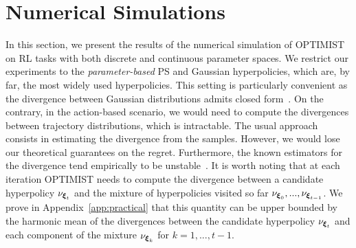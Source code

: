 \documentclass{article}
\makeatletter
\DeclareRobustCommand{\algoname}{OPTIMIST\@\xspace}
\makeatother
\begin{document}
\section{Numerical Simulations}\label{sec:exp}
In this section, we present the results of the numerical simulation of \algoname on RL tasks with both discrete and continuous parameter spaces. We restrict our experiments to the \emph{parameter-based} PS and Gaussian hyperpolicies, which are, by far, the most widely used hyperpolicies. This setting is particularly convenient as the \Renyi divergence between Gaussian distributions admits closed form~\cite{gil2013renyi}. On the contrary, in the action-based scenario, we would need to compute the divergences between trajectory distributions, which is intractable. The usual approach consists in estimating the \Renyi divergence from the samples. However, we would lose our theoretical guarantees on the regret. Furthermore, the known estimators for the \Renyi divergence tend empirically to be unstable~\cite{metelli2018policy}. It is worth noting that at each iteration \algoname needs to compute the \Renyi divergence between a candidate hyperpolicy $\nu_{\boldsymbol{\xi}_t}$ and the mixture of hyperpolicies visited so far $\nu_{\boldsymbol{\xi}_0}, ..., \nu_{\boldsymbol{\xi}_{t-1}}$. We prove in Appendix~\ref{app:practical} that this quantity can be upper bounded by the harmonic mean of the divergences between the candidate hyperpolicy $\nu_{\boldsymbol{\xi}_t}$ and each component of the mixture $\nu_{\boldsymbol{\xi}_{k}}$ for $k=1,...,t-1$. 
\end{document}
